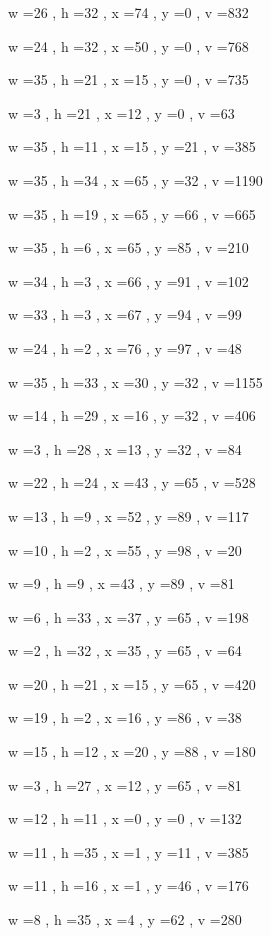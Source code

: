 \documentclass[11pt]{article}
\begin{document}
w =26 , h =32 , x =74 , y =0 , v =832
\par
w =24 , h =32 , x =50 , y =0 , v =768
\par
w =35 , h =21 , x =15 , y =0 , v =735
\par
w =3 , h =21 , x =12 , y =0 , v =63
\par
w =35 , h =11 , x =15 , y =21 , v =385
\par
w =35 , h =34 , x =65 , y =32 , v =1190
\par
w =35 , h =19 , x =65 , y =66 , v =665
\par
w =35 , h =6 , x =65 , y =85 , v =210
\par
w =34 , h =3 , x =66 , y =91 , v =102
\par
w =33 , h =3 , x =67 , y =94 , v =99
\par
w =24 , h =2 , x =76 , y =97 , v =48
\par
w =35 , h =33 , x =30 , y =32 , v =1155
\par
w =14 , h =29 , x =16 , y =32 , v =406
\par
w =3 , h =28 , x =13 , y =32 , v =84
\par
w =22 , h =24 , x =43 , y =65 , v =528
\par
w =13 , h =9 , x =52 , y =89 , v =117
\par
w =10 , h =2 , x =55 , y =98 , v =20
\par
w =9 , h =9 , x =43 , y =89 , v =81
\par
w =6 , h =33 , x =37 , y =65 , v =198
\par
w =2 , h =32 , x =35 , y =65 , v =64
\par
w =20 , h =21 , x =15 , y =65 , v =420
\par
w =19 , h =2 , x =16 , y =86 , v =38
\par
w =15 , h =12 , x =20 , y =88 , v =180
\par
w =3 , h =27 , x =12 , y =65 , v =81
\par
w =12 , h =11 , x =0 , y =0 , v =132
\par
w =11 , h =35 , x =1 , y =11 , v =385
\par
w =11 , h =16 , x =1 , y =46 , v =176
\par
w =8 , h =35 , x =4 , y =62 , v =280
\par
\newpage


\end{document}
